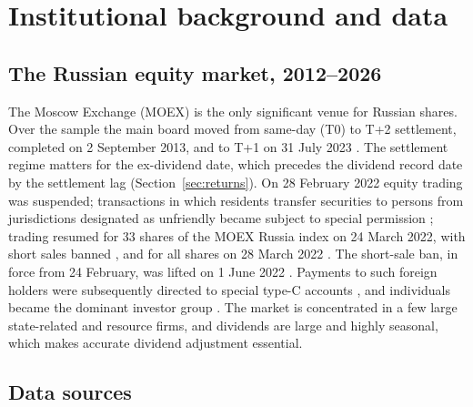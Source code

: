 \documentclass[11pt]{article}
\begin{document}
\section{Institutional background and data}\label{sec:data}

\subsection{The Russian equity market, 2012--2026}

The Moscow Exchange (MOEX) is the only significant venue for Russian shares. Over the sample the main board moved from
same-day (T0) to T+2 settlement, completed on 2 September 2013, and to T+1 on 31 July 2023 \citep{moex2023t1}. The
settlement regime matters for the ex-dividend date, which precedes the dividend record date by the settlement lag
(Section~\ref{sec:returns}). On 28 February 2022 equity trading was suspended; transactions in which residents
transfer securities to persons from jurisdictions designated as unfriendly became subject to special permission
\citep{decree81}; trading resumed for 33 shares of the MOEX Russia index on 24 March 2022, with short sales banned
\citep{cbr2022reopen}, and for all shares on 28 March 2022 \citep{moex2022allshares}. The short-sale ban, in force from 24
February, was lifted on 1 June 2022 \citep{cbr2022shortban}. Payments to such foreign holders
were subsequently directed to special type-C accounts \citep{decree95}, and individuals became the dominant investor
group \citep{moex2024retail}. The market is concentrated in a few large state-related and resource firms, and dividends are
large and highly seasonal, which makes accurate dividend adjustment essential.

\subsection{Data sources}\label{sec:sources}
\end{document}
